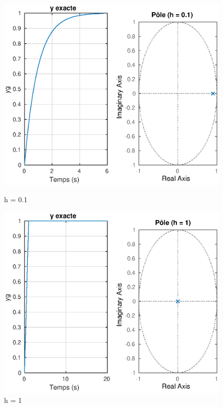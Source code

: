 \begin{figure}[!h] 
  \label{ fig7} 
  \begin{minipage}[b]{0.5\linewidth}
    \includegraphics[width=1\linewidth]{eps/labo1-yg-0-1} 
    \caption{h = 0.1} 
    \vspace{4ex}
  \end{minipage}%
  \begin{minipage}[b]{0.5\linewidth}
    \centering
    \includegraphics[width=1\linewidth]{eps/labo1-yg-1} 
    \caption{h = 1} 
        \label{gaude-tempsmin}

\end{minipage}
\end{figure}
